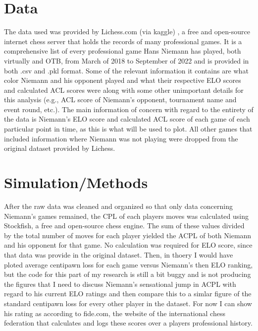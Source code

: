 \documentclass[12pt]{article}
\begin{document}
\section*{Data}
\label{sec:data}

The data used was provided by Lichess.com (via kaggle) \citep{zaidqureshi2022}, a free and open-source internet chess server that holds the records of many professional games. It is a comprehensive list of every professional game Hans Niemann has played, both virtually and OTB, from March of 2018 to September of 2022 and is provided in both .csv and .pkl format. Some of the relevant information it contains are what color Niemann and his opponent played and what their respective ELO scores and calculated ACL scores were along with some other unimportant details for this analysis (e.g., ACL score of Niemann's opponent, tournament name and event round, etc.). The main information of concern with regard to the entirety of the data is Niemann's ELO score and calculated ACL score of each game of each particular point in time, as this is what will be used to plot. All other games that included information where Niemann was not playing were dropped from the original dataset provided by Lichess.

\section*{Simulation/Methods}
\label{sec:sim}


After the raw data was cleaned and organized so that only data concerning Niemann's games remained, the CPL of each players moves was calculated using Stockfish, a free and open-source chess engine. The sum of these values divided by the total number of moves for each player yielded the ACPL of both Niemann and his opponent for that game. No calculation was required for ELO score, since that data was provide in the original dataset. Then, in thoery I would have ploted average centipawn loss for each game versus Niemann's then ELO ranking, but the code for this part of my research is still a bit buggy and is not producing the figures that I need to discuss Niemann's sensational jump in ACPL with regard to his current ELO ratings and then compare this to a simlar figure of the standard centipawn loss for every other player in the dataset. For now I can show his rating as according to fide.com, the website of the international chess federation that calculates and logs these scores over a players professional history.
\end{document}
